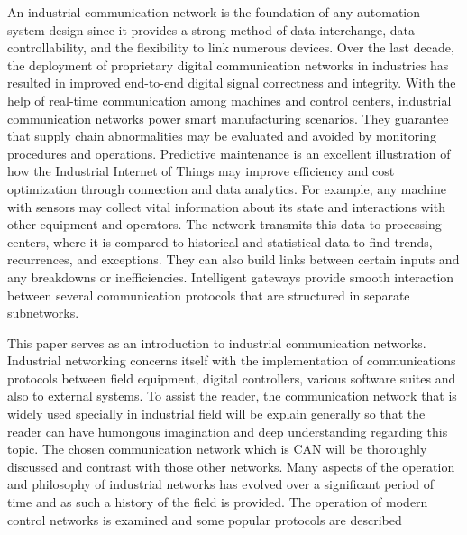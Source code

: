 An industrial communication network is the foundation of any automation system design since it provides a strong method of data interchange, data controllability, and the flexibility to link numerous devices. Over the last decade, the deployment of proprietary digital communication networks in industries has resulted in improved end-to-end digital signal correctness and integrity. With the help of real-time communication among machines and control centers, industrial communication networks power smart manufacturing scenarios. They guarantee that supply chain abnormalities may be evaluated and avoided by monitoring procedures and operations. Predictive maintenance is an excellent illustration of how the Industrial Internet of Things may improve efficiency and cost optimization through connection and data analytics. For example, any machine with sensors may collect vital information about its state and interactions with other equipment and operators. The network transmits this data to processing centers, where it is compared to historical and statistical data to find trends, recurrences, and exceptions. They can also build links between certain inputs and any breakdowns or inefficiencies. Intelligent gateways provide smooth interaction between several communication protocols that are structured in separate subnetworks.

This paper serves as an introduction to industrial communication networks. Industrial networking concerns itself with the implementation of communications protocols between field equipment, digital controllers, various software suites and also to external systems. To assist the reader, the communication network that is widely used specially in industrial field will be explain generally so that the reader can have humongous imagination and  deep understanding regarding this topic. The chosen communication network which is CAN will be thoroughly discussed and contrast with those other networks. Many aspects of the operation and philosophy of industrial networks has evolved over a significant period of time and as such a history of the field is provided. The operation of modern control networks is examined and some popular protocols are described